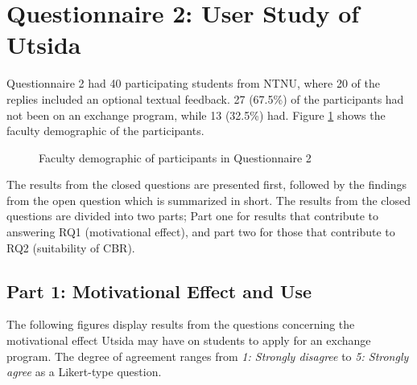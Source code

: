 \section{Questionnaire 2: User Study of Utsida}

Questionnaire 2 had 40 participating students from NTNU, where 20 of the replies included an optional textual feedback. 27 (67.5\%) of the participants had not been on an exchange program, while 13 (32.5\%) had. Figure \ref{fig:faculty_demographic} shows the faculty demographic of the participants.

\begin{figure}[h]
    \small
    \centering
    \caption{Faculty demographic of participants in Questionnaire 2}
    \label{fig:faculty_demographic}
\end{figure}

The results from the closed questions are presented first, followed by the findings from the open question which is summarized in short. The results from the closed questions are divided into two parts; Part one for results that contribute to answering RQ1 (motivational effect), and part two for those that contribute to RQ2 (suitability of CBR).

\subsection{Part 1: Motivational Effect and Use}

The following figures display results from the questions concerning the motivational effect Utsida may have on students to apply for an exchange program. The degree of agreement ranges from \textit{1: Strongly disagree} to \textit{5: Strongly agree} as a Likert-type question.


